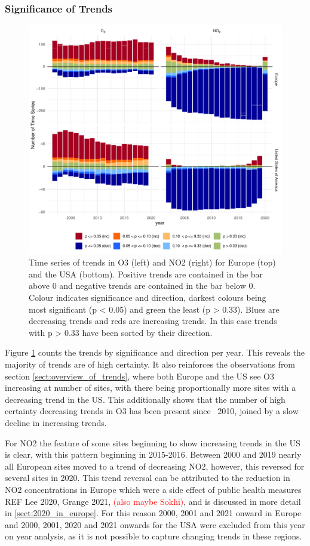 \documentclass[journal abbreviation, manuscript]{copernicus}
\begin{document}
\clearpage
\subsubsection{Significance of Trends} \label{sect:significance_of_trends}

\begin{figure}[htbp]
\includegraphics[width=12cm]{figures/f5_significance_bars.pdf}
\caption{Time series of trends in O3 (left) and NO2 (right) for Europe (top) and the USA (bottom). Positive trends are contained in the bar above 0 and negative trends are contained in the bar below 0. Colour indicates significance and direction, darkest colours being most significant (p < 0.05) and green the least (p > 0.33). Blues are decreasing trends and reds are increasing trends. In this case trends with p > 0.33 have been sorted by their direction.}
\label{fig:p_bar_year}
\end{figure}

Figure \ref{fig:p_bar_year} counts the trends by significance and direction per year. This reveals the majority of trends are of high certainty. It also reinforces the observations from section \ref{sect:overview_of_trends}, where both Europe and the US see O3 increasing at number of sites, with there being proportionally more sites with a decreasing trend in the US. This additionally shows that the number of high certainty decreasing trends in O3 has been present since ~2010, joined by a slow decline in increasing trends. 

For NO2 the feature of some sites beginning to show increasing trends in the US is clear, with this pattern beginning in 2015-2016. Between 2000 and 2019 nearly all European sites moved to a trend of decreasing NO2, however, this reversed for several sites in 2020. This trend reversal can be attributed to the reduction in NO2 concentrations in Europe which were a side effect of public health measures REF Lee 2020, Grange 2021, \textcolor{red}{(also maybe Sokhi)}, and is discussed in more detail in \ref{sect:2020_in_europe}. For this reason 2000, 2001 and 2021 onward in Europe and 2000, 2001, 2020 and 2021 onwards for the USA were excluded from this year on year analysis, as it is not possible to capture changing trends in these regions. 
\end{document}
